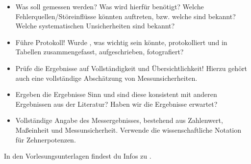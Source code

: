 \documentclass[letterpaper,10pt,english]{jupyterBook}
\begin{document}
\begin{itemize}
\item {} 
\sphinxAtStartPar
{} Was soll gemessen werden? Was wird hierfür benötigt? Welche Fehlerquellen/Störeinflüsse könnten auftreten, bzw. welche sind bekannt? Welche systematischen Unsicherheiten sind bekannt?

\item {} 
\sphinxAtStartPar
{} Führe Protokoll! Wurde , was wichtig sein könnte, protokolliert und in Tabellen zusammengefasst, aufgeschrieben, fotografiert?

\item {} 
\sphinxAtStartPar
{} Prüfe die Ergebnisse auf Vollständigkeit und Übersichtlichkeit! Hierzu gehört auch eine vollständige Abschätzung von Messunsicherheiten.

\item {} 
\sphinxAtStartPar
{} Ergeben die Ergebnisse Sinn und sind diese konsistent mit anderen Ergebnissen aus der Literatur? Haben wir die Ergebnisse erwartet?

\item {} 
\sphinxAtStartPar
{} Vollständige Angabe des Messergebnisses, bestehend aus Zahlenwert, Maßeinheit und Messunsicherheit. Verwende die wissenschaftliche Notation für Zehnerpotenzen.

\end{itemize}


\nopagebreak


\sphinxAtStartPar
In den Vorlesungsunterlagen findest du Infos zu .
\end{document}
